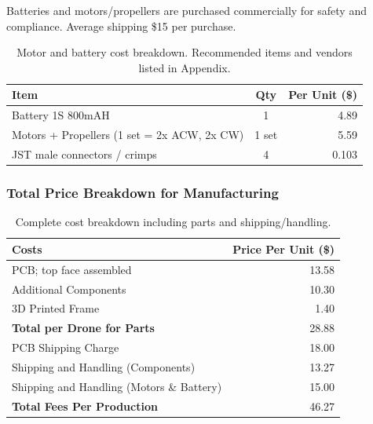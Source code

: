 Batteries and motors/propellers are purchased commercially for safety and compliance. Average shipping \$15 per purchase.

\begin{table}[H]
\centering
\begin{tabular}{l c r}
\toprule
\textbf{Item} & \textbf{Qty} & \textbf{Per Unit (\$)} \\
\midrule
Battery 1S 800mAH & 1 & 4.89 \\
Motors + Propellers (1 set = 2x ACW, 2x CW) & 1 set & 5.59 \\
JST male connectors / crimps & 4 & 0.103 \\
\bottomrule
\end{tabular}
\caption{Motor and battery cost breakdown. Recommended items and vendors listed in Appendix.}
\end{table}

\subsubsection{Total Price Breakdown for Manufacturing}

\begin{table}[H]
\centering
\begin{tabular}{l r}
\toprule
\textbf{Costs} & \textbf{Price Per Unit (\$)} \\
\midrule
PCB; top face assembled & 13.58 \\
Additional Components & 10.30 \\
3D Printed Frame & 1.40 \\
\midrule
\textbf{Total per Drone for Parts} & 28.88 \\
PCB Shipping Charge & 18.00 \\
Shipping and Handling (Components) & 13.27 \\
Shipping and Handling (Motors \& Battery) & 15.00 \\
\midrule
\textbf{Total Fees Per Production} & 46.27 \\
\bottomrule
\end{tabular}
\caption{Complete cost breakdown including parts and shipping/handling.}
\end{table}

